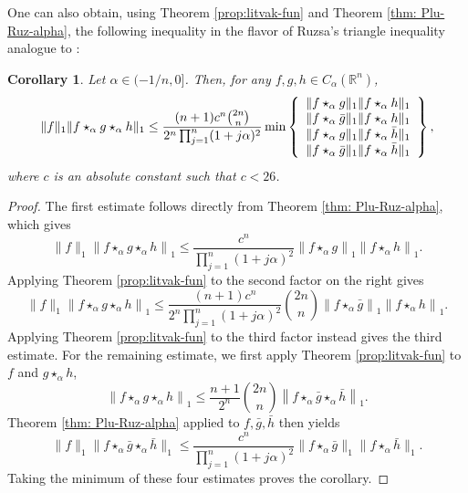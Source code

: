 \documentclass[11pt]{amsart}
\newcommand{\R}{{\mathbb R}}
\theoremstyle{plain}
\newtheorem{corollary}[theorem]{Corollary}
\theoremstyle{definition}
\theoremstyle{remark}
\begin{document}
One can also obtain, using Theorem \ref{prop:litvak-fun} and Theorem \ref{thm: Plu-Ruz-alpha}, the following inequality in the flavor of Ruzsa's triangle inequality analogue to \cite[Theorem 5.2]{FMZ-24}:
\begin{corollary}
    Let $\alpha \in (-1/n,0]$. Then, for any $f,g,h \in C_\alpha (\R^n)$, \
    \begin{align}
        \| f\|_1 \| f \star_\alpha g \star_\alpha h \|_1
        \leq
        \frac{(n+1)c^n\binom{2n}{n}}{2^n\prod_{j=1}^n(1+j \alpha)^2}  \min \left\{
        \begin{array}{c}
             \| f \star_\alpha {g}  \|_1 \| f \star_\alpha h \|_1
             \\
             \| f \star_\alpha \Bar{g}  \|_1 \| f \star_\alpha h \|_1
             \\
             \| f \star_\alpha {g}  \|_1 \| f \star_\alpha \Bar{h} \|_1
             \\
             \| f \star_\alpha \Bar{g}  \|_1 \| f \star_\alpha \Bar{h} \|_1
        \end{array}
        \right\},
    \end{align}
    where $c$ is an absolute constant such that $c<26$.
\end{corollary}

\begin{proof}
The first estimate follows directly from Theorem \ref{thm: Plu-Ruz-alpha}, which gives
$$
\|f\|_1\left\|f \star_\alpha g \star_\alpha h\right\|_1 \leq \frac{c^n}{\prod_{j=1}^n(1+j \alpha)^2}\left\|f \star_\alpha g\right\|_1\left\|f \star_\alpha h\right\|_1 .
$$
Applying Theorem \ref{prop:litvak-fun}  to the second factor on the right gives
$$
\|f\|_1\left\|f \star_\alpha g \star_\alpha h\right\|_1 \leq \frac{(n+1) c^n}{2^n \prod_{j=1}^n(1+j \alpha)^2}\binom{2 n}{n}\left\|f \star_\alpha \bar{g}\right\|_1\left\|f \star_\alpha h\right\|_1 .
$$
Applying Theorem \ref{prop:litvak-fun} to the third factor instead gives the third estimate.
For the remaining estimate, we first apply Theorem \ref{prop:litvak-fun} to $f$ and $g \star_\alpha h$,
$$
\left\|f \star_\alpha g \star_\alpha h\right\|_1 \leq \frac{n+1}{2^n}\binom{2 n}{n}\left\|f \star_\alpha \bar{g} \star_\alpha \bar{h}\right\|_1 .
$$
Theorem \ref{thm: Plu-Ruz-alpha} applied to $f, \bar{g}, \bar{h}$ then yields
$$
\|f\|_1\|f \star_\alpha \bar{g} \star_\alpha \bar{h}\|_1 \leq \frac{c^n}{\prod_{j=1}^n(1+j \alpha)^2}\|f \star_\alpha \bar{g}\|_1\|f \star_\alpha \bar{h}\|_1 .
$$
Taking the minimum of these four estimates proves the corollary.
\end{proof}
\end{document}
